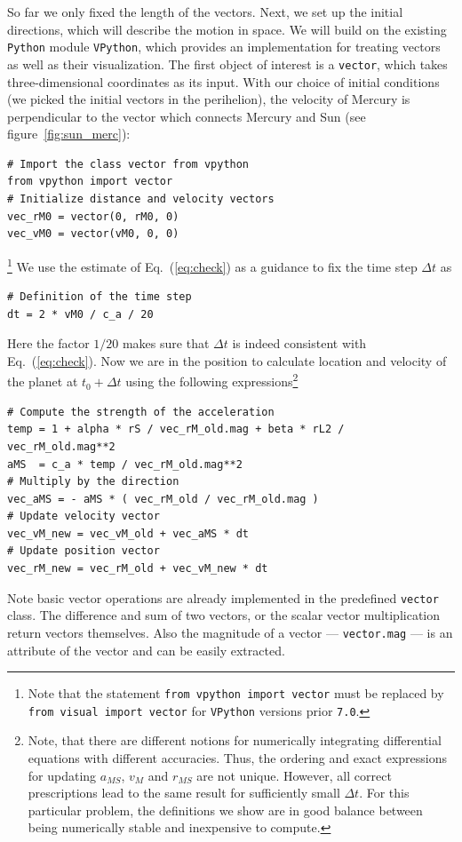 \documentclass[12pt,ngerman,american]{iopart}
\newcommand{\python}[0]{\texttt{Python}}
\newcommand{\vpython}[0]{\texttt{VPython}}
\newcommand{\code}[1]{{\scriptsize\colorbox{light-gray}{\texttt{#1}}}}
\begin{document}
So far we only fixed the length of the vectors. Next, we set up the initial directions, which will describe the motion in space.
We will build on the existing \python{} module \vpython{}, which provides an implementation for treating vectors as well as their visualization.
The first object of interest is a \texttt{vector}, which takes three-dimensional coordinates as its input.
With our choice of initial conditions (we picked the initial vectors in the perihelion), the velocity of Mercury is perpendicular to the vector which connects Mercury and Sun (see figure~\ref{fig:sun_merc}):
\begin{lstlisting}
# Import the class vector from vpython
from vpython import vector
# Initialize distance and velocity vectors
vec_rM0 = vector(0, rM0, 0)
vec_vM0 = vector(vM0, 0, 0)
\end{lstlisting}\footnote{Note that the statement \code{from vpython import vector} must be replaced by \code{from visual import vector} for \vpython{} versions prior \texttt{7.0}.}
We use the estimate of Eq.~(\ref{eq:check}) as a guidance to fix the time step $\Delta t$ as
\begin{lstlisting}
# Definition of the time step
dt = 2 * vM0 / c_a / 20
\end{lstlisting}
Here the factor $1/20$ makes sure that $\Delta t$ is indeed consistent with Eq.~(\ref{eq:check}).
Now we are in the position to calculate location and velocity of the planet at $t_0+\Delta t$ using the following expressions\footnote{%
	Note, that there are different notions for numerically integrating differential equations with different accuracies.
	Thus, the ordering and exact expressions for updating $a_{MS}$, $v_M$ and $r_{MS}$ are not unique. However, all correct prescriptions lead to the same result for sufficiently small $\Delta t$.
	For this particular problem, the definitions we show are in good balance between being numerically stable and inexpensive to compute.
}%
\begin{lstlisting}
# Compute the strength of the acceleration
temp = 1 + alpha * rS / vec_rM_old.mag + beta * rL2 / vec_rM_old.mag**2
aMS  = c_a * temp / vec_rM_old.mag**2
# Multiply by the direction
vec_aMS = - aMS * ( vec_rM_old / vec_rM_old.mag )
# Update velocity vector
vec_vM_new = vec_vM_old + vec_aMS * dt
# Update position vector
vec_rM_new = vec_rM_old + vec_vM_new * dt
\end{lstlisting}
Note basic vector operations are already implemented in the predefined \texttt{vector} class.
The difference and sum of two vectors, or the scalar vector multiplication return vectors themselves.
Also the magnitude of a vector --- \code{vector.mag} --- is an attribute of the vector and can be easily extracted.
\end{document}
